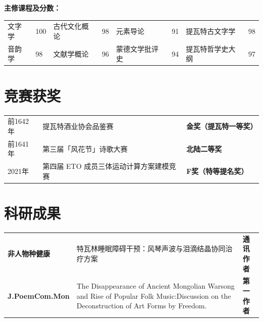 \documentclass[11pt]{article}
\begin{document}
            \textbf{主修课程及分数：}
            \vspace{-0.8em}
            \begin{table}[h]
                \centering
                \begin{tabular}{ p{2cm} p{} p{3cm} p{} p{3.5cm} p{} p{4cm} p{}}
                    文字学 & 100 & 古代文化概论   & 98 & 元素导论 & 91 & 提瓦特古文字学 & 98 \\
                    音韵学 & 98 & 文献学概论    & 96 & 蒙德文学批评史 & 94 & 提瓦特哲学史大纲   & 97 
                \end{tabular}
            \end{table}
            \vspace{-1.2em}
    \section{\makebox[\widthof{\faGraduationCap}][c]{\color{CPU_Red}{\faTrophy}}\quad 竞赛获奖}
    \vspace{-1.2em}
    \begin{table}[h!]
        \begin{tabularx}{\textwidth}{p{}Xp{}}
            前1642年 & 提瓦特酒业协会品鉴赛       & \textbf{金奖（提瓦特一等奖）}        \\
            前1641年 & 第三届「风花节」诗歌大赛         & \textbf{北陆二等奖}        \\
            2021年 & 第四届 ETO 成员三体运动计算方案建模竞赛          & \textbf{F奖（特等提名奖）}
        \end{tabularx}
    \end{table}
    \section{\makebox[\widthof{\faGraduationCap}][c]{\color{CPU_Red}{ \faClipboard}}\quad 科研成果}
    \vspace{-1.2em}
    \begin{table}[h!]
        \begin{tabularx}{\textwidth}{p{}Xp{}}
            \textbf{非人物种健康} & 特瓦林睡眠障碍干预：风琴声波与泪滴结晶协同治疗方案 & \textbf{通讯作者}        \\
            \textbf{J.PoemCom.Mon} & The Disappearance of Ancient Mongolian Warsong and Rise of Popular Folk Music:Discussion on the Deconstruction of Art Forms by Freedom.& \textbf{第一作者}\\
        \end{tabularx}
    \end{table}
\end{document}
